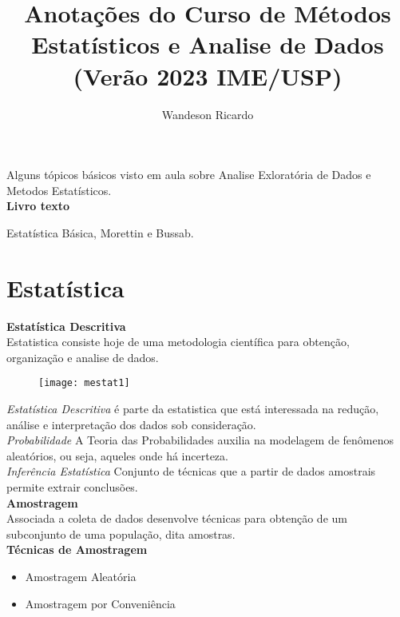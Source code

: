 \documentclass[12pt,a4paper]{article}
\title{Anotações do Curso de Métodos Estatísticos e Analise de Dados (Verão 2023 IME/USP) }
\author{Wandeson Ricardo}
\begin{document}
	\maketitle
	Alguns tópicos básicos visto em aula sobre Analise Exloratória de Dados e Metodos Estatísticos.\\
	
	\textbf{Livro texto}
	
	Estatística Básica, Morettin e Bussab. \\
	
	\section{Estatística}
	
	\textbf{Estatística Descritiva} \\


	Estatistica consiste hoje de uma metodologia científica para obtenção, organização e analise de dados.
	 
	 \begin{figure}[h]
	 	\centering
	 	\texttt{[image: mestat1]}
	 	\caption{}
	 	\label{fig:mestat1}
	 \end{figure}

	\textit{Estatística Descritiva} é parte da estatistica que está interessada na redução, análise e interpretação dos dados sob consideração.\\
	
	\textit{Probabilidade} A Teoria das Probabilidades auxilia na modelagem de fenômenos aleatórios, ou seja, aqueles onde há incerteza.\\
	
	\textit{Inferência Estatística} Conjunto de técnicas que a partir de dados amostrais permite extrair conclusões.\\
	
	\textbf{Amostragem}\\
	
	Associada a coleta de dados desenvolve técnicas para obtenção de um subconjunto de uma população, dita amostras.\\
		 
	\textbf{Técnicas de Amostragem }
	
		\begin{itemize}
			\item Amostragem Aleatória
			\item Amostragem por Conveniência
		\end{itemize}
	\vskip 10pt
 	
\end{document}
